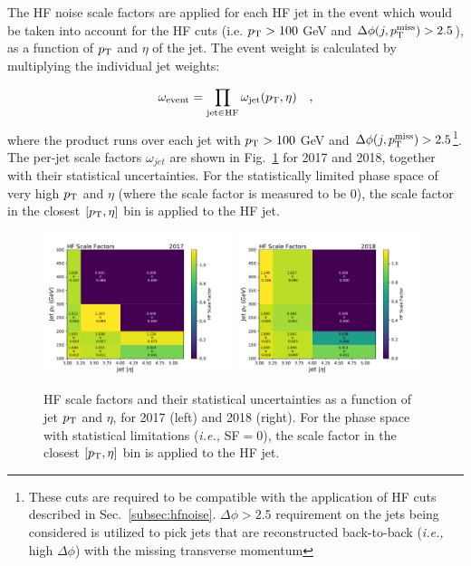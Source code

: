 The HF noise scale factors are applied for each HF jet in the event which would be taken into account for the HF cuts (i.e. $p_{\textrm{T}} > 100$ GeV 
and $\Delta\phi(j,p_{\textrm{T}}^{\textrm{miss}}) > 2.5$), as a function of $p_{\textrm{T}}$ and $\eta$ of the jet. The event weight is calculated by multiplying the individual jet weights:

\begin{equation}
    \omega_{\textrm{event}} = \prod_{\textrm{jet} \in \textrm{HF}} \omega_{\textrm{jet}} (p_{\textrm{T}}, \eta) \quad ,
\end{equation}
where the product runs over each jet with $p_{\textrm{T}} > 100$ GeV and $\Delta\phi(j,p_{\textrm{T}}^{\textrm{miss}}) > 2.5$\footnote{These cuts are required
to be compatible with the application of HF cuts described in Sec.~\ref{subsec:hfnoise}. $\Delta\phi > 2.5$ requirement on
the jets being considered is utilized to pick jets that are reconstructed back-to-back (\textit{i.e.,} high $\Delta\phi$) with the missing
transverse momentum}.
The per-jet scale factors $\omega_{jet}$ are shown in Fig.~\ref{fig:hf_scale_factors} for 2017 and 2018, together with their statistical uncertainties. 
For the statistically limited phase space of very high $p_{\textrm{T}}$ and $\eta$ (where the scale factor is measured to be $0$), 
the scale factor in the closest $[ p_{\textrm{T}}, \eta ]$ bin is applied to the HF jet.

\begin{figure}[ht!]
    \begin{center}
        \includegraphics[width=0.49\textwidth]{ScaleFactors/HFCuts/hf_sf_2017.pdf}
        \includegraphics[width=0.49\textwidth]{ScaleFactors/HFCuts/hf_sf_2018.pdf}
        \caption{
            HF scale factors and their statistical uncertainties as a function of jet $p_{\textrm{T}}$ and $\eta$, for 2017 (left) and 2018 (right). 
            For the phase space with statistical limitations (\textit{i.e.,} SF$=0$), the scale factor in the closest $[ p_{\textrm{T}}, \eta ]$ bin is applied to the HF jet.
          }
        \label{fig:hf_scale_factors}
    \end{center}
\end{figure}

